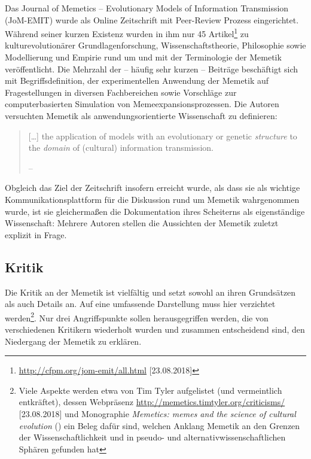 \documentclass[openany,twoside,twocolumn]{book}
\let\rmarkdownfootnote\footnote%
\def\footnote{\protect\rmarkdownfootnote}
\begin{document}
Das Journal of Memetics -- Evolutionary Models of Information
Transmission (JoM-EMIT) wurde als Online Zeitschrift mit Peer-Review
Prozess eingerichtet. Während seiner kurzen Existenz wurden in ihm nur
45 Artikel\footnote{\url{http://cfpm.org/jom-emit/all.html}
  {[}23.08.2018{]}} zu kulturevolutionärer Grundlagenforschung,
Wissenschaftstheorie, Philosophie sowie Modellierung und Empirie rund um
und mit der Terminologie der Memetik veröffentlicht. Die Mehrzahl der --
häufig sehr kurzen -- Beiträge beschäftigt sich mit Begriffsdefinition,
der experimentellen Anwendung der Memetik auf Fragestellungen in
diversen Fachbereichen sowie Vorschläge zur computerbasierten Simulation
von Memeexpansionsprozessen. Die Autoren versuchten Memetik als
anwendungsorientierte Wissenschaft zu definieren:

\begin{quote}
{[}\ldots{}{]} the application of models with an evolutionary or genetic
\emph{structure} to the \emph{domain} of (cultural) information
transmission.

-- \textcite{edmonds_modelling_1998}
\end{quote}

Obgleich das Ziel der Zeitschrift insofern erreicht wurde, als dass sie
als wichtige Kommunikationsplattform für die Diskussion rund um Memetik
wahrgenommen wurde, ist sie gleichermaßen die Dokumentation ihres
Scheiterns als eigenständige Wissenschaft: Mehrere Autoren stellen die
Aussichten der Memetik zuletzt explizit in Frage.

\hypertarget{memetics-critique}{%
\subsection{Kritik}\label{memetics-critique}}

Die Kritik an der Memetik ist vielfältig und setzt sowohl an ihren
Grundsätzen als auch Details an. Auf eine umfassende Darstellung muss
hier verzichtet werden\footnote{Viele Aspekte werden etwa von Tim Tyler
  aufgelistet (und vermeintlich entkräftet), dessen Webpräsenz
  \url{http://memetics.timtyler.org/criticisms/} {[}23.08.2018{]} und
  Monographie \emph{Memetics: memes and the science of cultural
  evolution} (\textcite{tyler_memetics_2011}) ein Beleg dafür sind,
  welchen Anklang Memetik an den Grenzen der Wissenschaftlichkeit und in
  pseudo- und alternativwissenschaftlichen Sphären gefunden hat}. Nur
drei Angriffspunkte sollen herausgegriffen werden, die von verschiedenen
Kritikern wiederholt wurden und zusammen entscheidend sind, den
Niedergang der Memetik zu erklären.
\end{document}
